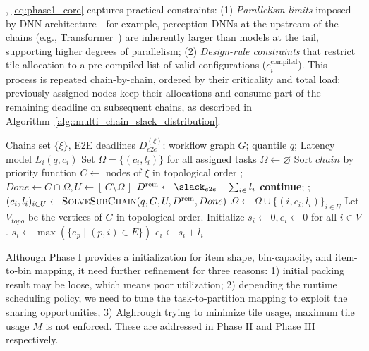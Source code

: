 , \eqref{eq:phase1_core} captures practical constraints: (1) \emph{Parallelism limits} imposed by DNN architecture---for example, perception DNNs at the upstream of the chains (e.g., Transformer~\cite{Li2022-BEVFormer}) are inherently larger than models at the tail, supporting higher degrees of parallelism; (2) \emph{Design-rule constraints} that restrict tile allocation to a pre-compiled list of valid configurations (\(c_i^{\text{compiled}}\)). 
This process is repeated chain-by-chain, ordered by their criticality and total load; previously assigned nodes keep their allocations and consume part of the remaining deadline on subsequent chains, as described in Algorithm~\ref{alg::multi_chain_slack_distribution}.

\begin{algorithm}[t]
  \caption{Multi-Chain Slack Distribution (Chain-by-Chain)}
  \label{alg::multi_chain_slack_distribution}
  \footnotesize
  \begin{algorithmic}[1]
    \renewcommand{\algorithmicrequire}{\textbf{Input:}}
    \renewcommand{\algorithmicensure}{\textbf{Output:}}
    \Require Chains set $\{\xi\}$, E2E deadlines $D^{(\xi)}_{e2e}$; workflow graph $G$; quantile $q$; Latency model $L_i(q, c_i)$
    \Ensure Set $\Omega=\{(c_i, l_i)\}$ for all assigned tasks
    \State $\Omega \leftarrow \varnothing$ 
    \State Sort ${chain}$ by priority function
      \State $C \leftarrow$ nodes of $\xi$ in topological order
      ; 
      \State $Done \leftarrow C\cap \Omega, U \leftarrow [\, C\setminus \Omega\,]$ 
      \State $D^{\text{rem}} \leftarrow \slack_{e2e} - \sum_{i\in } l_i$ \label{alg::rem_deadline}
       \textbf{continue}; 
      \EndIf
      ; 
      \State $(c_i,l_i)_{i\in U} \leftarrow \textsc{SolveSubChain}(q, G, U, D^{\text{rem}}, Done)$ 
      \State $\Omega \leftarrow \Omega \cup \{(i, c_i, l_i)\}_{i\in U}$
    \EndFor
    \State Let $V_{topo}$ be the vertices of $G$ in topological order.
    \State Initialize $s_i \leftarrow 0, e_i \leftarrow 0$ for all $i \in V$.
      \State $s_i \leftarrow \max(\{e_p \mid (p, i) \in E\})$ 
      \State $e_i \leftarrow s_i + l_i$ 
    \EndFor
  \end{algorithmic}
\end{algorithm}
Although Phase I provides a initialization for item shape, bin-capacity, and item-to-bin mapping, 
it need further refinement for three reasons: 1) initial packing result may be loose, which means poor utilization; 2) depending the runtime scheduling policy, we need to tune the task-to-partition mapping to exploit the sharing opportunities, 3) Alghrough trying to minimize tile usage, maximum tile usage $M$ is not enforced. 
These are addressed in Phase II and Phase III respectively.


